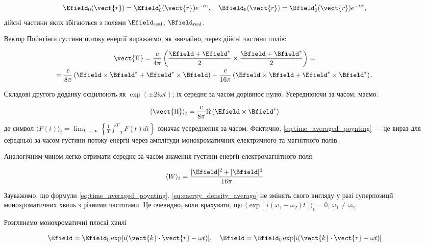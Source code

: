 \begin{equation*}
\Efield_0(\vect{r}) = \Efield'_0(\vect{r}) e^{-i\alpha}, \quad \Bfield_0(\vect{r}) = \Bfield'_0(\vect{r}) e^{-i\alpha},
\end{equation*}
дійсні частини яких збігаються з полями \(\Efield_{\text{real}}\), \(\Bfield_{\text{real}}\).

Вектор Пойнгінга густини потоку енергії виражаємо, як звичайно, через дійсні частини полів:

\begin{multline*}
\vect{\Pi} = \frac{c}{4\pi} \left( \frac{\Efield + \Efield^{*}}{2} \times \frac{\Bfield + \Bfield^{*}}{2} \right) = \\
= \frac{c}{8\pi} \left( \Efield \times \Bfield^{*} + \Efield^{*} \times \Bfield \right) + \frac{c}{16\pi} \left( \Efield \times \Bfield +
\Efield^{*} \times \Bfield^{*} \right).
\end{multline*}

Складові другого доданку осцилюють як \(\exp(\pm 2i\omega t)\); їх середнє за часом дорівнює нулю. Усереднюючи за часом, маємо:

\begin{equation}
\langle \vect{\Pi} \rangle_t = \frac{c}{8\pi} \Re\left(\Efield \times \Bfield^{*}\right)
\label{eq:time_averaged_poynting}
\end{equation}
де символ \(\langle F(t) \rangle_t = \lim_{T \to \infty} \left\{ \frac{1}{T} \int_{-T}^{T} F(t) dt \right\}\) означає усереднення за часом. Фактично,
\eqref{eq:time_averaged_poynting} --- це вираз для середньої за часом густини потоку енергії через амплітуди монохроматичних електричного та магнітного
полів.

Аналогічним чином легко отримати середнє за часом значення густини енергії електромагнітного поля:

\begin{equation}
\langle W \rangle_t = \frac{\lvert \Efield \rvert^2 + \lvert \Bfield \rvert^2}{16\pi}
\label{eq:energy_density_average}
\end{equation}

Зауважимо, що формули \eqref{eq:time_averaged_poynting}, \eqref{eq:energy_density_average} не змінять свого вигляду у разі суперпозиції монохроматичних
хвиль з різними частотами. Це очевидно, коли врахувати, що \(\langle \exp[i(\omega_1 - \omega_2)t] \rangle_t = 0\), \(\omega_1 \neq \omega_2\).

Розглянемо монохроматичні плоскі хвилі

\begin{equation*}
\Efield = \Efield_0 \exp[i(\vect{k} \cdot \vect{r} - \omega t)], \quad \Bfield = \Bfield_0 \exp[i(\vect{k} \cdot \vect{r} - \omega t)]
\label{eq:monochromatic_waves}
\end{equation*}

